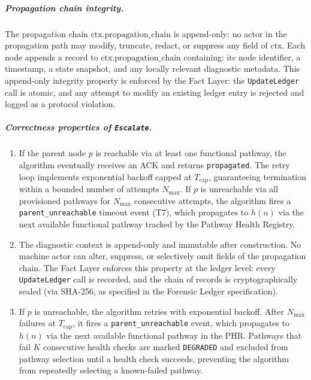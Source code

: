 \subparagraph{Propagation chain integrity.} The propagation chain $\text{ctx.propagation\_chain}$ is append-only: no actor in the propagation path may modify, truncate, redact, or suppress any field of $\text{ctx}$. Each node appends a record to $\text{ctx.propagation\_chain}$ containing: its node identifier, a timestamp, a state snapshot, and any locally relevant diagnostic metadata. This append-only integrity property is enforced by the Fact Layer: the \texttt{UpdateLedger} call is atomic, and any attempt to modify an existing ledger entry is rejected and logged as a protocol violation.

\subparagraph{Correctness properties of \texttt{Escalate}.}

\begin{enumerate}
\item[\emph{Progress.}] If the parent node $p$ is reachable via at least one functional pathway, the algorithm eventually receives an ACK and returns \texttt{propagated}. The retry loop implements exponential backoff capped at $T_{\text{cap}}$, guaranteeing termination within a bounded number of attempts $N_{\max}$. If $p$ is unreachable via all provisioned pathways for $N_{\max}$ consecutive attempts, the algorithm fires a \texttt{parent\_unreachable} timeout event (T7), which propagates to $h(n)$ via the next available functional pathway tracked by the Pathway Health Registry.

\item[\emph{Integrity.}] The diagnostic context is append-only and immutable after construction. No machine actor can alter, suppress, or selectively omit fields of the propagation chain. The Fact Layer enforces this property at the ledger level: every \texttt{UpdateLedger} call is recorded, and the chain of records is cryptographically sealed (via SHA-256, as specified in the \bxthree{} Forensic Ledger specification).

\item[\emph{Liveness under pathway degradation.}] If $p$ is unreachable, the algorithm retries with exponential backoff. After $N_{\max}$ failures at $T_{\text{cap}}$, it fires a \texttt{parent\_unreachable} event, which propagates to $h(n)$ via the next available functional pathway in the PHR. Pathways that fail $K$ consecutive health checks are marked \texttt{DEGRADED} and excluded from pathway selection until a health check succeeds, preventing the algorithm from repeatedly selecting a known-failed pathway.
\end{enumerate}

